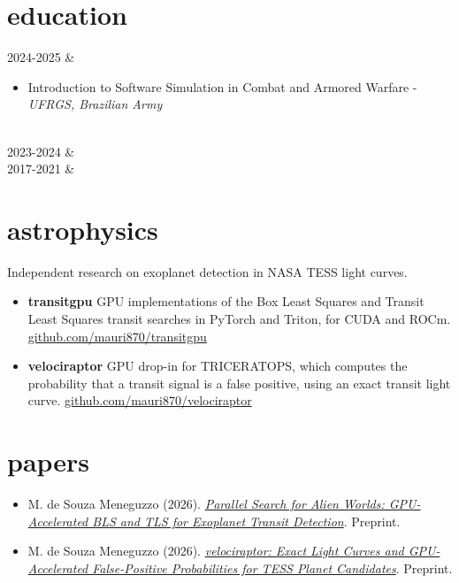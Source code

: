 \documentclass[]{cv-mauri}
\begin{document}
\section*{education}
\begin{tabularcv}
	2024-2025	&   
					\begin{itemize}
						\item Introduction to Software Simulation in Combat and Armored Warfare - \textit{UFRGS, Brazilian Army}
					\end{itemize}
					\\[\vspacepar]
	2023-2024   	&   
					\\[\vspacepar]
    2017-2021   &   
                    \\[\vspacepar]
\end{tabularcv}

\section*{astrophysics}
Independent research on exoplanet detection in NASA TESS light curves.
\begin{itemize}
	\item \textbf{transitgpu} GPU implementations of the Box Least Squares and Transit Least Squares transit searches in PyTorch and Triton, for CUDA and ROCm. \href{https://github.com/mauri870/transitgpu}{github.com/mauri870/transitgpu}
	\item \textbf{velociraptor} GPU drop-in for TRICERATOPS, which computes the probability that a transit signal is a false positive, using an exact transit light curve. \href{https://github.com/mauri870/velociraptor}{github.com/mauri870/velociraptor}
\end{itemize}

\section*{papers}
\begin{itemize}
	\item M. de Souza Meneguzzo (2026). \href{https://github.com/mauri870/transitgpu/blob/main/paper/main.pdf}{\textit{Parallel Search for Alien Worlds: GPU-Accelerated BLS and TLS for Exoplanet Transit Detection}}. Preprint.
	\item M. de Souza Meneguzzo (2026). \href{https://github.com/mauri870/velociraptor/blob/main/paper/main.pdf}{\textit{velociraptor: Exact Light Curves and GPU-Accelerated False-Positive Probabilities for TESS Planet Candidates}}. Preprint.
\end{itemize}
\end{document}
